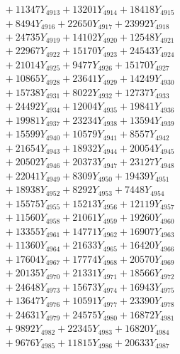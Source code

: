 \documentclass[a4paper,10pt]{article}
\begin{document}
{\begin{align}
&\;  + 11347 Y_{4913} + 13201 Y_{4914} + 18418 Y_{4915} \\[0.3ex]
&\;  + 8494 Y_{4916} + 22650 Y_{4917} + 23992 Y_{4918} \\[0.5ex]\allowbreak
&\;  + 24735 Y_{4919} + 14102 Y_{4920} + 12548 Y_{4921} \\[0.3ex]
&\;  + 22967 Y_{4922} + 15170 Y_{4923} + 24543 Y_{4924} \\[0.3ex]
&\;  + 21014 Y_{4925} + 9477 Y_{4926} + 15170 Y_{4927} \\[0.3ex]
&\;  + 10865 Y_{4928} + 23641 Y_{4929} + 14249 Y_{4930} \\[0.3ex]
&\;  + 15738 Y_{4931} + 8022 Y_{4932} + 12737 Y_{4933} \\[0.3ex]
&\;  + 24492 Y_{4934} + 12004 Y_{4935} + 19841 Y_{4936} \\[0.3ex]
&\;  + 19981 Y_{4937} + 23234 Y_{4938} + 13594 Y_{4939} \\[0.3ex]
&\;  + 15599 Y_{4940} + 10579 Y_{4941} + 8557 Y_{4942} \\[0.3ex]
&\;  + 21654 Y_{4943} + 18932 Y_{4944} + 20054 Y_{4945} \\[0.3ex]
&\;  + 20502 Y_{4946} + 20373 Y_{4947} + 23127 Y_{4948} \\[0.5ex]\allowbreak
&\;  + 22041 Y_{4949} + 8309 Y_{4950} + 19439 Y_{4951} \\[0.3ex]
&\;  + 18938 Y_{4952} + 8292 Y_{4953} + 7448 Y_{4954} \\[0.3ex]
&\;  + 15575 Y_{4955} + 15213 Y_{4956} + 12119 Y_{4957} \\[0.3ex]
&\;  + 11560 Y_{4958} + 21061 Y_{4959} + 19260 Y_{4960} \\[0.3ex]
&\;  + 13355 Y_{4961} + 14771 Y_{4962} + 16907 Y_{4963} \\[0.3ex]
&\;  + 11360 Y_{4964} + 21633 Y_{4965} + 16420 Y_{4966} \\[0.3ex]
&\;  + 17604 Y_{4967} + 17774 Y_{4968} + 20570 Y_{4969} \\[0.3ex]
&\;  + 20135 Y_{4970} + 21331 Y_{4971} + 18566 Y_{4972} \\[0.3ex]
&\;  + 24648 Y_{4973} + 15673 Y_{4974} + 16943 Y_{4975} \\[0.3ex]
&\;  + 13647 Y_{4976} + 10591 Y_{4977} + 23390 Y_{4978} \\[0.5ex]\allowbreak
&\;  + 24631 Y_{4979} + 24575 Y_{4980} + 16872 Y_{4981} \\[0.3ex]
&\;  + 9892 Y_{4982} + 22345 Y_{4983} + 16820 Y_{4984} \\[0.3ex]
&\;  + 9676 Y_{4985} + 11815 Y_{4986} + 20633 Y_{4987} \\[0.3ex]

\end{align}}
\end{document}
